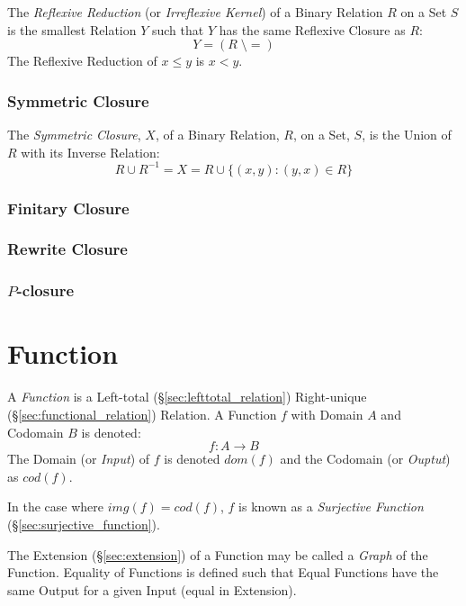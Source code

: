 The \emph{Reflexive Reduction} (or \emph{Irreflexive Kernel}) of a
Binary Relation $R$ on a Set $S$ is the smallest Relation $Y$ such
that $Y$ has the same Reflexive Closure as $R$:
\[
  Y = (R\;\setminus=)
\]
The Reflexive Reduction of $x \leq y$ is $x < y$.



\subsubsection{Symmetric Closure}\label{sec:symmetric_closure}

The \emph{Symmetric Closure}, $X$, of a Binary Relation, $R$, on a
Set, $S$, is the Union of $R$ with its Inverse Relation:
\[
  R \cup R^{-1} = X = R \cup \{(x,y) : (y,x) \in R\}
\]



\subsubsection{Finitary Closure}\label{sec:finitary_closure}

\subsubsection{Rewrite Closure}\label{sec:rewrite_closure}

\subsubsection{$P$-closure}\label{sec:p_closure}



\section{Function}\label{sec:function}

A \emph{Function} is a Left-total (\S\ref{sec:lefttotal_relation})
Right-unique (\S\ref{sec:functional_relation}) Relation. A Function
$f$ with Domain $A$ and Codomain $B$ is denoted:
\[
  f : A \rightarrow B
\]
The Domain (or \emph{Input}) of $f$ is denoted $dom(f)$ and the
Codomain (or \emph{Ouptut}) as $cod(f)$.

In the case where $img(f) = cod(f)$, $f$ is known as a
\emph{Surjective Function} (\S\ref{sec:surjective_function}).

The Extension (\S\ref{sec:extension}) of a Function may be called a
\emph{Graph} of the Function. Equality of Functions is defined such
that Equal Functions have the same Output for a given Input (equal in
Extension).

